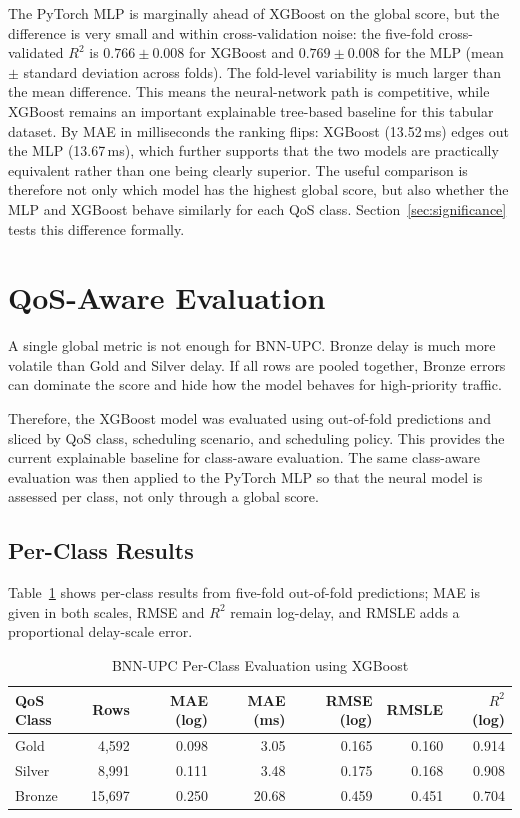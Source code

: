 \documentclass[a4paper,12pt]{Classes/RoboticsLaTeX}
\begin{document}
The PyTorch MLP is marginally ahead of XGBoost on the global score, but the difference is very small and within cross-validation noise: the five-fold cross-validated $R^2$ is $0.766 \pm 0.008$ for XGBoost and $0.769 \pm 0.008$ for the MLP (mean $\pm$ standard deviation across folds). The fold-level variability is much larger than the mean difference. This means the neural-network path is competitive, while XGBoost remains an important explainable tree-based baseline for this tabular dataset. By MAE in milliseconds the ranking flips: XGBoost (13.52\,ms) edges out the MLP (13.67\,ms), which further supports that the two models are practically equivalent rather than one being clearly superior. The useful comparison is therefore not only which model has the highest global score, but also whether the MLP and XGBoost behave similarly for each QoS class. Section~\ref{sec:significance} tests this difference formally.

\section{QoS-Aware Evaluation}

A single global metric is not enough for BNN-UPC. Bronze delay is much more volatile than Gold and Silver delay. If all rows are pooled together, Bronze errors can dominate the score and hide how the model behaves for high-priority traffic.

Therefore, the XGBoost model was evaluated using out-of-fold predictions and sliced by QoS class, scheduling scenario, and scheduling policy. This provides the current explainable baseline for class-aware evaluation. The same class-aware evaluation was then applied to the PyTorch MLP so that the neural model is assessed per class, not only through a global score.

\subsection{Per-Class Results}

Table~\ref{tab:per_class_results} shows per-class results from five-fold out-of-fold predictions; MAE is given in both scales, RMSE and $R^2$ remain log-delay, and RMSLE adds a proportional delay-scale error.

\begin{table}[H]
\centering
\caption{BNN-UPC Per-Class Evaluation using XGBoost}
\label{tab:per_class_results}
\begingroup
\footnotesize
\setlength{\tabcolsep}{4pt}
\begin{tabular}{|l|r|r|r|r|r|r|}
\hline
\textbf{QoS Class} & \textbf{Rows} & \textbf{MAE (log)} & \textbf{MAE (ms)} & \textbf{RMSE (log)} & \textbf{RMSLE} & \textbf{$R^2$ (log)} \\
\hline
Gold & 4,592 & 0.098 & 3.05 & 0.165 & 0.160 & 0.914 \\
\hline
Silver & 8,991 & 0.111 & 3.48 & 0.175 & 0.168 & 0.908 \\
\hline
Bronze & 15,697 & 0.250 & 20.68 & 0.459 & 0.451 & 0.704 \\
\hline
\end{tabular}
\endgroup
\end{table}
\end{document}
